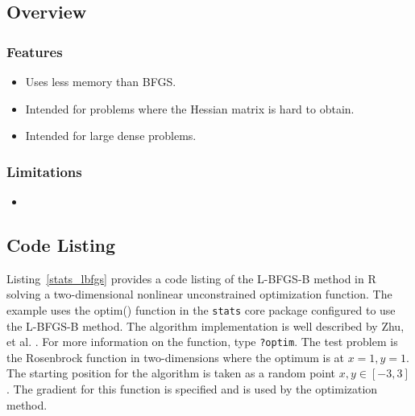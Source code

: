 \subsection{Overview}

\subsubsection{Features}

\begin{itemize}
	\item Uses less memory than BFGS.
	\item Intended for problems where the Hessian matrix is hard to obtain.
	\item Intended for large dense problems.
\end{itemize}

\subsubsection{Limitations}

\begin{itemize}
	\item 
\end{itemize}


\subsection{Code Listing}
Listing~\ref{stats_lbfgs} provides a code listing of the L-BFGS-B method in R solving a two-dimensional nonlinear unconstrained optimization function.
The example uses the {optim()} function in the \texttt{stats} core package configured to use the L-BFGS-B method. The algorithm implementation is well described by Zhu, et al. \cite{Zhu1997}. For more information on the function, type \texttt{?optim}.
The test problem is the Rosenbrock function in two-dimensions where the optimum is at $x=1, y=1$. The starting position for the algorithm is taken as a random point $x,y \in [-3,3]$. The gradient for this function is specified and is used by the optimization method.




